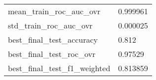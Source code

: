 \begin{tabular}{ll}
mean\_train\_roc\_auc\_ovr      &                                           0.999961 \\
std\_train\_roc\_auc\_ovr       &                                           0.000025 \\
best\_final\_test\_accuracy    &                                              0.812 \\
best\_final\_test\_roc\_ovr     &                                            0.97529 \\
best\_final\_test\_f1\_weighted &                                           0.813859 \\
\bottomrule
\end{tabular}
